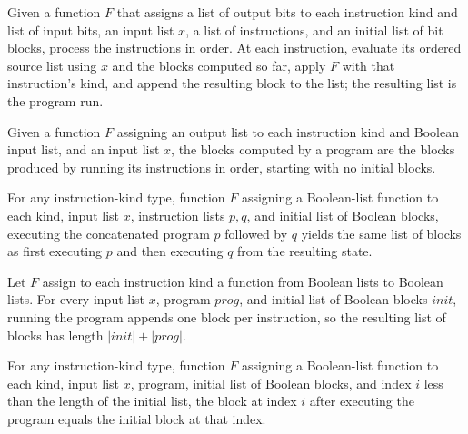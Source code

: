 \begin{definition}
\label{BoolCircuit.progRun}
\leanok
{}
Given a function $F$ that assigns a list of output bits to each instruction kind and
list of input bits, an input list $x$, a list of instructions, and an initial list of
bit blocks, process the instructions in order. At each instruction, evaluate its ordered
source list using $x$ and the blocks computed so far, apply $F$ with that instruction's
kind, and append the resulting block to the list; the resulting list is the program run.
\end{definition}

\begin{definition}
\label{BoolCircuit.progBlocks}
\leanok
{}
Given a function $F$ assigning an output list to each instruction kind and Boolean input
list, and an input list $x$, the blocks computed by a program are the blocks produced by
running its instructions in order, starting with no initial blocks.
\end{definition}

\begin{theorem}
\label{BoolCircuit.progRun_append}
\leanok
{}
For any instruction-kind type, function $F$ assigning a Boolean-list function to each
kind, input list $x$, instruction lists $p,q$, and initial list of Boolean blocks,
executing the concatenated program $p$ followed by $q$ yields the same list of blocks as
first executing $p$ and then executing $q$ from the resulting state.
\end{theorem}

\begin{theorem}
\label{BoolCircuit.length_progRun}
\leanok
{}
Let $F$ assign to each instruction kind a function from Boolean lists to Boolean lists.
For every input list $x$, program $prog$, and initial list of Boolean blocks $init$,
running the program appends one block per instruction, so the resulting list of blocks
has length $|init|+|prog|$.
\end{theorem}

\begin{theorem}
\label{BoolCircuit.progRun_getD_of_lt}
\leanok
{}
For any instruction-kind type, function $F$ assigning a Boolean-list function to each
kind, input list $x$, program, initial list of Boolean blocks, and index $i$ less than
the length of the initial list, the block at index $i$ after executing the program
equals the initial block at that index.
\end{theorem}

